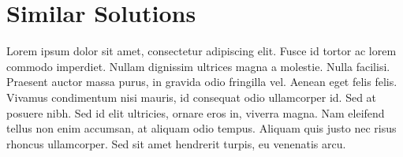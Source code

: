 \section{Similar Solutions}\label{sect:similar solutions}
\hspace{\parindent} Lorem ipsum dolor sit amet, consectetur adipiscing elit. Fusce id tortor ac lorem commodo imperdiet. Nullam dignissim ultrices magna a molestie. Nulla facilisi. Praesent auctor massa purus, in gravida odio fringilla vel. Aenean eget felis felis. Vivamus condimentum nisi mauris, id consequat odio ullamcorper id. Sed at posuere nibh. Sed id elit ultricies, ornare eros in, viverra magna. Nam eleifend tellus non enim accumsan, at aliquam odio tempus. Aliquam quis justo nec risus rhoncus ullamcorper. Sed sit amet hendrerit turpis, eu venenatis arcu.